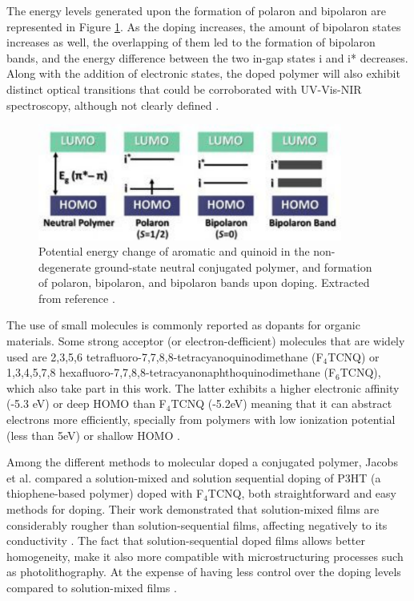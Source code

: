 The energy levels generated upon the formation of polaron and bipolaron are represented in Figure \ref{fig:ebipol}. As the doping increases, the amount of bipolaron states increases as well, the overlapping of them led to the formation of bipolaron bands, and the energy difference between the two in-gap states i and i* decreases. Along with the addition of electronic states, the doped polymer will also exhibit distinct optical transitions that could be corroborated with UV-Vis-NIR spectroscopy, although not clearly defined \cite{heydarigharahcheshmehTextureNanostructuralEngineering2020}.

\begin{figure}[h]
  \centering
  \includegraphics[width=10cm]{Images/pdf/bi-polaron.pdf}
  \caption[Formation of polaron, bipolaron, and bipolaron band]{Potential energy change of aromatic and quinoid in the non-degenerate ground-state neutral conjugated polymer, and formation of polaron, bipolaron, and bipolaron bands upon doping. Extracted from reference \cite{heydarigharahcheshmehTextureNanostructuralEngineering2020}.}
  \label{fig:ebipol}
\end{figure}

The use of small molecules is commonly reported as dopants for organic materials. Some strong acceptor (or electron-defficient) molecules that are widely used are 2,3,5,6 tetrafluoro-7,7,8,8-tetracyanoquinodimethane (F$_{4}$TCNQ) or 1,3,4,5,7,8 hexafluoro-7,7,8,8-tetracyanonaphthoquinodimethane (F$_{6}$TCNQ), which also take part in this work. The latter exhibits a higher electronic affinity (-5.3 eV) or deep HOMO than F$_{4}$TCNQ (-5.2eV) meaning that it can abstract electrons more efficiently, specially from polymers with low ionization potential (less than 5eV) or shallow HOMO \cite{kieferDoubleDopingConjugated2019}%
.

Among the different methods to molecular doped a conjugated polymer, Jacobs et al. compared a solution-mixed and solution sequential doping of P3HT (a thiophene-based polymer) doped with F$_{4}$TCNQ, both straightforward and easy methods for doping. Their work demonstrated that solution-mixed films are considerably rougher than solution-sequential films, affecting negatively to its conductivity \cite{jacobsComparisonSolutionmixedSequentially2016}. The fact that solution-sequential doped films allows better homogeneity, make it also more compatible with microstructuring processes such as photolithography. At the expense of having less control over the doping levels compared to solution-mixed films \cite{tanOrganicMixedIonic2022}.


